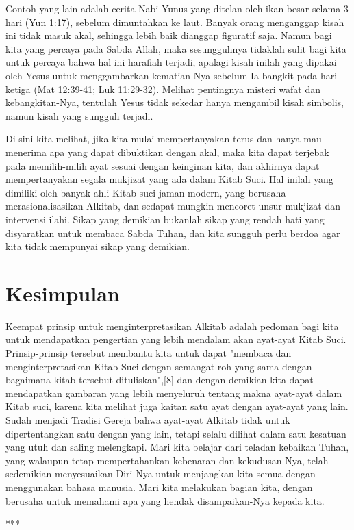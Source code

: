 Contoh yang lain adalah cerita Nabi Yunus yang ditelan oleh ikan besar selama 3 hari (Yun 1:17), sebelum dimuntahkan ke laut. Banyak orang menganggap kisah ini tidak masuk akal, sehingga lebih baik dianggap figuratif saja. Namun bagi kita yang percaya pada Sabda Allah, maka sesungguhnya tidaklah sulit bagi kita untuk percaya bahwa hal ini harafiah terjadi, apalagi kisah inilah yang dipakai oleh Yesus untuk menggambarkan kematian-Nya sebelum Ia bangkit pada hari ketiga (Mat 12:39-41; Luk 11:29-32). Melihat pentingnya misteri wafat dan kebangkitan-Nya, tentulah Yesus tidak sekedar hanya mengambil kisah simbolis, namun kisah yang sungguh terjadi.

Di sini kita melihat, jika kita mulai mempertanyakan terus dan hanya mau menerima apa yang dapat dibuktikan dengan akal, maka kita dapat terjebak pada memilih-milih ayat sesuai dengan keinginan kita, dan akhirnya dapat mempertanyakan segala mukjizat yang ada dalam Kitab Suci. Hal inilah yang dimiliki oleh banyak ahli Kitab suci jaman modern, yang berusaha merasionalisasikan Alkitab, dan sedapat mungkin mencoret unsur mukjizat dan intervensi ilahi. Sikap yang demikian bukanlah sikap yang rendah hati yang disyaratkan untuk membaca Sabda Tuhan, dan kita sungguh perlu berdoa agar kita tidak mempunyai sikap yang demikian.

\section*{Kesimpulan}
\begin{footnotesize}
Keempat prinsip untuk menginterpretasikan Alkitab adalah pedoman bagi kita untuk mendapatkan pengertian yang lebih mendalam akan ayat-ayat Kitab Suci. Prinsip-prinsip tersebut membantu kita untuk dapat "membaca dan menginterpretasikan Kitab Suci dengan semangat roh yang sama dengan bagaimana kitab tersebut dituliskan",[8] dan dengan demikian kita dapat mendapatkan gambaran yang lebih menyeluruh tentang makna ayat-ayat dalam Kitab suci, karena kita melihat juga kaitan satu ayat dengan ayat-ayat yang lain. Sudah menjadi Tradisi Gereja bahwa ayat-ayat Alkitab tidak untuk dipertentangkan satu dengan yang lain, tetapi selalu dilihat dalam satu kesatuan yang utuh dan saling melengkapi. Mari kita belajar dari teladan kebaikan Tuhan, yang walaupun tetap mempertahankan kebenaran dan kekudusan-Nya, telah sedemikian menyesuaikan Diri-Nya untuk menjangkau kita semua dengan menggunakan bahasa manusia. Mari kita melakukan bagian kita, dengan berusaha untuk memahami apa yang hendak disampaikan-Nya kepada kita.
\end{footnotesize}
\begin{center} ***\end{center}
\normalsize